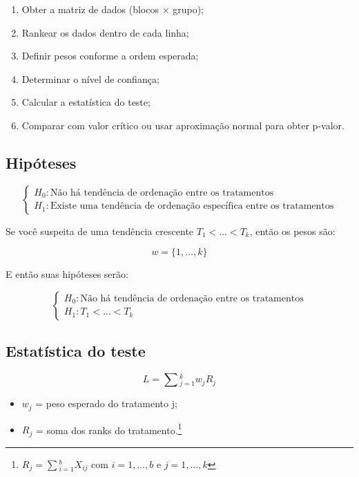 \documentclass[
  letterpaper,
  DIV=11,
  numbers=noendperiod]{scrartcl}
\providecommand{\tightlist}{%
  \setlength{\itemsep}{0pt}\setlength{\parskip}{0pt}}\usepackage{longtable,booktabs,array}
\begin{document}
\begin{enumerate}
\def\labelenumi{\arabic{enumi}.}
\tightlist
\item
  Obter a matriz de dados (blocos × grupo);
\item
  Rankear os dados dentro de cada linha;
\item
  Definir pesos conforme a ordem esperada;
\item
  Determinar o nível de confiança;
\item
  Calcular a estatística do teste;
\item
  Comparar com valor crítico ou usar aproximação normal para obter
  p-valor.
\end{enumerate}

\subsection{Hipóteses}\label{hipuxf3teses}

\[
\begin{cases}
H_0: \text{Não há tendência de ordenação entre os tratamentos} \\
H_1: \text{Existe uma tendência de ordenação específica entre os tratamentos}
\end{cases}
\]

Se você suspeita de uma tendência crescente \(T_{1} < \dots < T_{k}\),
então os pesos são:

\[w = \{1,\dots,k\}\]

E então suas hipóteses serão:

\[
\begin{cases}
H_0: \text{Não há tendência de ordenação entre os tratamentos} \\
H_1: T_{1} < \dots < T_{k}
\end{cases}
\]

\subsection{Estatística do teste}\label{estatuxedstica-do-teste}

\[ L = \sum{}_{j=1}^{k}w_{j}R_{j}\]

\begin{itemize}
\item
  \(w_{j}\) = peso esperado do tratamento j;
\item
  \(R_{j}\) = soma dos ranks do tratamento.\footnote{\(R_{j} =  \sum{}_{i=1}^{b}X_{ij}\)
    com \(i = {1,\dots,b}\) e \(j = {1,\dots,k}\)}
\end{itemize}
\end{document}
